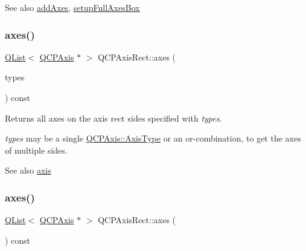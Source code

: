 \begin{DoxySeeAlso}{See also}
\hyperlink{class_q_c_p_axis_rect_a792e1f3d9cb1591fca135bb0de9b81fc}{add\+Axes}, \hyperlink{class_q_c_p_axis_rect_a5fa906175447b14206954f77fc7f1ef4}{setup\+Full\+Axes\+Box} 
\end{DoxySeeAlso}
\mbox{\label{class_q_c_p_axis_rect_a8db4722cb93e9c4a6f0d91150c200867}} 
\subsubsection{\texorpdfstring{axes()}{axes()}\hspace{0.1cm}{\footnotesize\ttfamily [1/2]}}
{\footnotesize\ttfamily \hyperlink{class_q_list}{Q\+List}$<$ \hyperlink{class_q_c_p_axis}{Q\+C\+P\+Axis} $\ast$ $>$ Q\+C\+P\+Axis\+Rect\+::axes (\begin{DoxyParamCaption}\item[{Q\+C\+P\+Axis\+::\+Axis\+Types}]{types }\end{DoxyParamCaption}) const}

Returns all axes on the axis rect sides specified with {\itshape types}.

{\itshape types} may be a single \hyperlink{class_q_c_p_axis_ae2bcc1728b382f10f064612b368bc18a}{Q\+C\+P\+Axis\+::\+Axis\+Type} or an {\ttfamily or}-\/combination, to get the axes of multiple sides.

\begin{DoxySeeAlso}{See also}
\hyperlink{class_q_c_p_axis_rect_a583ae4f6d78b601b732183f6cabecbe1}{axis} 
\end{DoxySeeAlso}
\mbox{\label{class_q_c_p_axis_rect_a11657b8faebe9677180860e8057ede26}} 
\subsubsection{\texorpdfstring{axes()}{axes()}\hspace{0.1cm}{\footnotesize\ttfamily [2/2]}}
{\footnotesize\ttfamily \hyperlink{class_q_list}{Q\+List}$<$ \hyperlink{class_q_c_p_axis}{Q\+C\+P\+Axis} $\ast$ $>$ Q\+C\+P\+Axis\+Rect\+::axes (\begin{DoxyParamCaption}{ }\end{DoxyParamCaption}) const}

